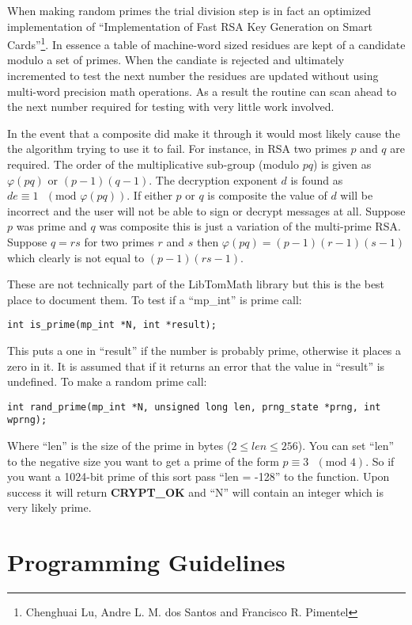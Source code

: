 \documentclass[a4paper]{book}
\def\phi{\varphi}
\begin{document}
When making random primes the trial division step is in fact an optimized implementation of ``Implementation of Fast RSA Key Generation on Smart Cards''\footnote{Chenghuai Lu, Andre L. M. dos Santos and Francisco R. Pimentel}.
In essence a table of machine-word sized residues are kept of a candidate modulo a set of primes.  When the candiate
is rejected and ultimately incremented to test the next number the residues are updated without using multi-word precision
math operations.  As a result the routine can scan ahead to the next number required for testing with very little work
involved.

In the event that a composite did make it through it would most likely cause the the algorithm trying to use it to fail.  For 
instance, in RSA two primes $p$ and $q$ are required.  The order of the multiplicative sub-group (modulo $pq$) is given 
as $\phi(pq)$ or $(p - 1)(q - 1)$.  The decryption exponent $d$ is found as $de \equiv 1\mbox{ }(\mbox{mod } \phi(pq))$.  If either $p$ or $q$ is composite the value of $d$ will be incorrect and the user
will not be able to sign or decrypt messages at all.  Suppose $p$ was prime and $q$ was composite this is just a variation of 
the multi-prime RSA.  Suppose $q = rs$ for two primes $r$ and $s$ then $\phi(pq) = (p - 1)(r - 1)(s - 1)$ which clearly is 
not equal to $(p - 1)(rs - 1)$.

These are not technically part of the LibTomMath library but this is the best place to document them.  
To test if a ``mp\_int'' is prime call:
\begin{verbatim}
int is_prime(mp_int *N, int *result);
\end{verbatim}
This puts a one in ``result'' if the number is probably prime, otherwise it places a zero in it.  It is assumed that if 
it returns an error that the value in ``result'' is undefined.  To make 
a random prime call:
\begin{verbatim}
int rand_prime(mp_int *N, unsigned long len, prng_state *prng, int wprng);
\end{verbatim}
Where ``len'' is the size of the prime in bytes ($2 \le len \le 256$).  You can set ``len'' to the negative size you want
to get a prime of the form $p \equiv 3\mbox{ }(\mbox{mod } 4)$.  So if you want a 1024-bit prime of this sort pass 
``len = -128'' to the function.  Upon success it will return {\bf CRYPT\_OK} and ``N'' will contain an integer which
is very likely prime.

\chapter{Programming Guidelines}
\end{document}

